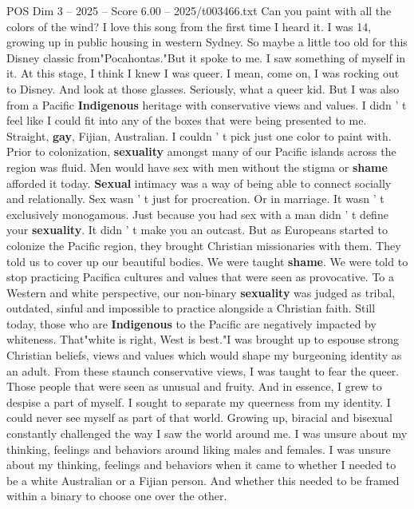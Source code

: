 \begin{textsample}{POS Dim 3 – 2025 – Score 6.00 – 2025/t003466.txt}  \label{ex:f3_pos_026}
Can you paint with all the colors of the wind?
I love this song from the first time I heard it.
I was 14, growing up in public housing in western Sydney.
So maybe a little too old for this Disney classic from"Pocahontas."But it spoke to me.
I saw something of myself in it.
At this stage, I think I knew I was queer.
I mean, come on, I was rocking out to Disney.
And look at those glasses.
Seriously, what a queer kid.
But I was also from a Pacific \textbf{Indigenous} heritage with conservative views and values.
I didn ' t feel like I could fit into any of the boxes that were being presented to me.
Straight, \textbf{gay}, Fijian, Australian.
I couldn ' t pick just one color to paint with.
Prior to colonization, \textbf{sexuality} amongst many of our Pacific islands across the region was fluid.
Men would have sex with men without the stigma or \textbf{shame} afforded it today. \textbf{Sexual} intimacy was a way of being able to connect socially and relationally.
Sex wasn ' t just for procreation.
Or in marriage.
It wasn ' t exclusively monogamous.
Just because you had sex with a man didn ' t define your \textbf{sexuality}.
It didn ' t make you an outcast.
But as Europeans started to colonize the Pacific region, they brought Christian missionaries with them.
They told us to cover up our beautiful bodies.
We were taught \textbf{shame}.
We were told to stop practicing Pacifica cultures and values that were seen as provocative.
To a Western and white perspective, our non-binary \textbf{sexuality} was judged as tribal, outdated, sinful and impossible to practice alongside a Christian faith.
Still today, those who are \textbf{Indigenous} to the Pacific are negatively impacted by whiteness.
That"white is right, West is best."I was brought up to espouse strong Christian beliefs, views and values which would shape my burgeoning identity as an adult.
From these staunch conservative views, I was taught to fear the queer.
Those people that were seen as unusual and fruity.
And in essence, I grew to despise a part of myself.
I sought to separate my queerness from my identity.
I could never see myself as part of that world.
Growing up, biracial and bisexual constantly challenged the way I saw the world around me.
I was unsure about my thinking, feelings and behaviors around liking males and females.
I was unsure about my thinking, feelings and behaviors when it came to whether I needed to be a white Australian or a Fijian person.
And whether this needed to be framed within a binary to choose one over the other.

\end{textsample}
